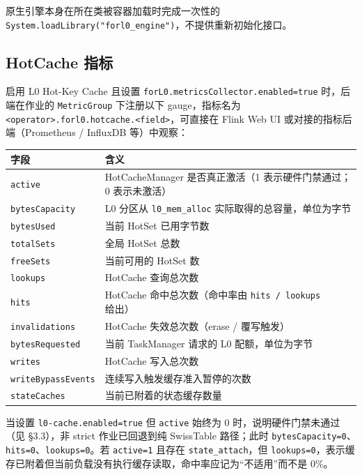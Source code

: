 \documentclass[a4paper,11pt]{article}
\begin{document}
原生引擎本身在所在类被容器加载时完成一次性的 \texttt{System.loadLibrary("forl0\_engine")}，不提供重新初始化接口。

\subsection{HotCache 指标}

启用 L0 Hot-Key Cache 且设置 \texttt{forL0.metricsCollector.enabled=true} 时，后端在作业的 \texttt{MetricGroup} 下注册以下 gauge，指标名为 \texttt{<operator>.forl0.hotcache.<field>}，可直接在 Flink Web UI 或对接的指标后端（Prometheus / InfluxDB 等）中观察：

\begin{table}[H]
\centering
\small
\begin{tabularx}{\textwidth}{L{3.8cm} X}
\toprule
\textbf{字段} & \textbf{含义} \\
\midrule
\texttt{active}         & HotCacheManager 是否真正激活（1 表示硬件门禁通过；0 表示未激活） \\
\texttt{bytesCapacity} & L0 分区从 \texttt{l0\_mem\_alloc} 实际取得的总容量，单位为字节 \\
\texttt{bytesUsed}     & 当前 HotSet 已用字节数 \\
\texttt{totalSets}     & 全局 HotSet 总数 \\
\texttt{freeSets}      & 当前可用的 HotSet 数 \\
\texttt{lookups}       & HotCache 查询总次数 \\
\texttt{hits}          & HotCache 命中总次数（命中率由 \texttt{hits / lookups} 给出） \\
\texttt{invalidations} & HotCache 失效总次数（erase / 覆写触发） \\
\texttt{bytesRequested} & 当前 TaskManager 请求的 L0 配额，单位为字节 \\
\texttt{writes} & HotCache 写入总次数 \\
\texttt{writeBypassEvents} & 连续写入触发缓存准入暂停的次数 \\
\texttt{stateCaches} & 当前已附着的状态缓存数量 \\
\bottomrule
\end{tabularx}
\end{table}

当设置 \texttt{l0-cache.enabled=true} 但 \texttt{active} 始终为 0 时，说明硬件门禁未通过（见 \S3.3），非 strict 作业已回退到纯 SwissTable 路径；此时 \texttt{bytesCapacity=0}、\texttt{hits=0}、\texttt{lookups=0}。若 \texttt{active=1} 且存在 \texttt{state\_attach}，但 \texttt{lookups=0}，表示缓存已附着但当前负载没有执行缓存读取，命中率应记为“不适用”而不是 0\%。
\end{document}
